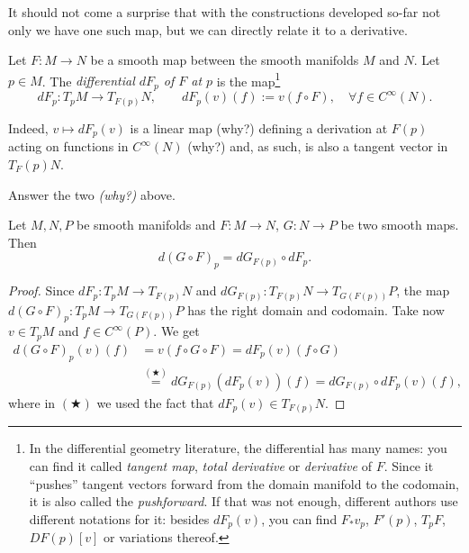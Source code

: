 It should not come a surprise that with the constructions developed so-far not only we have one such map, but we can directly relate it to a derivative.

\begin{definition}\label{def:differentialMap}
  Let $F: M \to N$ be a smooth map between the smooth manifolds $M$ and $N$.
  Let $p\in M$. The \emph{differential $d F_p$ of $F$ at $p$} is the map\footnote{In the differential geometry literature, the differential has many names: you can find it called \emph{tangent map}, \emph{total derivative} or \emph{derivative} of $F$. Since it ``pushes'' tangent vectors forward from the domain manifold to the codomain, it is also called the \emph{pushforward}. If that was not enough, different authors use different notations for it: besides $dF_p(v)$, you can find $F_* v_p$, $F'(p)$, $T_pF$, $DF(p)[v]$ or variations thereof.}
  \begin{equation}
    d F_p : T_p M \to T_{F(p)} N, \qquad d F_p (v) (f) := v(f\circ F), \quad \forall f\in C^\infty(N).
  \end{equation}  
\end{definition}

Indeed, $v \mapsto d F_p (v)$ is a linear map (why?) defining a derivation at $F(p)$ acting on functions in $C^\infty(N)$ (why?) and, as such, is also a tangent vector in $T_F(p)N$.

\begin{exercise}
  Answer the two \emph{(why?)} above.
\end{exercise}

\begin{theorem}\label{thm:chainrule_mfld}
  Let $M, N, P$ be smooth manifolds and $F: M \to N$, $G: N\to P$ be two smooth maps. Then
  \begin{equation}
    d(G\circ F)_p = dG_{F(p)} \circ dF_p.
  \end{equation}
\end{theorem}
\begin{proof}
  Since $dF_p : T_p M \to T_{F(p)}N$ and $dG_{F(p)}: T_{F(p)}N \to T_{G(F(p))}P$, the map $d(G\circ F)_p: T_p M \to T_{G(F(p))}P$ has the right domain and codomain.
  Take now $v\in T_p M$ and $f\in C^\infty(P)$. We get
  \begin{align}
    d(G\circ F)_p(v)(f) &= v(f\circ G \circ F)
    = dF_p (v)(f\circ G) \\
    &\stackrel{(\bigstar)}{=} dG_{F(p)}(dF_p (v))(f)
    = dG_{F(p)} \circ dF_p (v)(f),
  \end{align}
  where in $(\bigstar)$ we used the fact that $dF_p (v)\in T_{F(p)}N$.
\end{proof}

